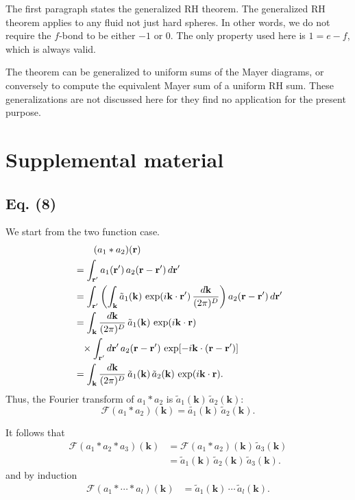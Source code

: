 \documentclass[preprint]{revtex4-1}
\numberwithin{equation}{subsection}
\numberwithin{table}{section}
\newcommand{\vct}[1]{\mathbf{#1}}
\providecommand{\vr}{} %
\renewcommand{\vr}{\vct{r}}
\newcommand{\vk}{\vct{k}}
\newcommand{\dvk}{\frac{d\vk}{(2\pi)^D}}
\newcommand{\FT}{\mathscr{F}}
\begin{document}
The first paragraph states the generalized RH theorem.
%
The generalized RH theorem applies to any fluid
not just hard spheres.
%
In other words, we do not require the $f$-bond
to be either $-1$ or $0$.
%
The only property used here is $1 = e - f$,
which is always valid.

The theorem can be generalized to uniform sums of
the Mayer diagrams,
or conversely to compute the equivalent Mayer sum
of a uniform RH sum.
%
These generalizations are not discussed here
for they find no application for the present purpose.



\section{Supplemental material}

\subsection{Eq. (8)}

We start from the two function case.
%
\begin{align}
& \hphantom{=\int} (a_1 * a_2)(\vr)
\notag \\
&=
  \int_{\vr'}
    a_1(\vr') \,
    a_2(\vr - \vr') \, d\vr'
\notag \\
&=
  \int_{\vr'}
    \left(
      \int_\vk \tilde{a}_1(\vk) \, \exp(i\vk\cdot\vr') \, \dvk
    \right)
    a_2(\vr - \vr') \, d\vr'
\notag \\
&=
  \int_\vk \dvk \,
  \tilde{a}_1(\vk) \,
  \exp(i\vk\cdot\vr)
\notag \\
&\hphantom{=}\times
  \int_{\vr'} d\vr' \,
    a_2(\vr - \vr') \, \exp[-i\vk\cdot(\vr - \vr')]
\notag \\
&=
  \int_\vk \dvk \,
  \tilde{a}_1(\vk) \,
  \tilde{a}_2(\vk) \,
  \exp(i\vk\cdot\vr).
  \label{eq:convol}
\end{align}
Thus, the Fourier transform of $a_1 * a_2$ is
$\tilde{a}_1(\vk) \, \tilde{a}_2(\vk)$:
\[
  \FT(a_1 * a_2)(\vk) = \tilde{a_1}(\vk) \, \tilde{a}_2(\vk).
\]

It follows that
\begin{align*}
  \FT(a_1 * a_2 * a_3)(\vk)
&= \FT(a_1 * a_2)(\vk) \, \tilde{a}_3(\vk)
  \\
&= \tilde{a}_1(\vk) \, \tilde{a}_2(\vk) \, \tilde{a}_3(\vk).
\end{align*}
and by induction
\begin{align*}
  \FT(a_1 * \cdots * a_l)(\vk)
&= \tilde{a}_1(\vk) \, \cdots \, \tilde{a}_l(\vk).
\end{align*}
\end{document}
